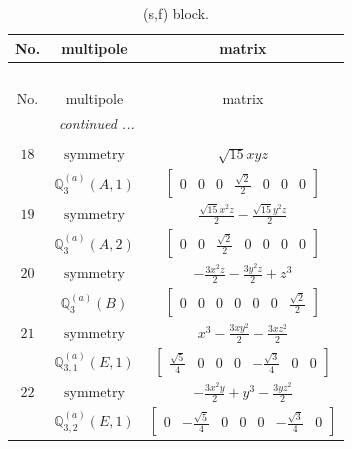 \documentclass[fleqn,8pt,landscape]{jsarticle}
\begin{document}
\begin{longtable}{ccc}
\caption{(s,f) block.}
 \\
 \hline \hline
No. & multipole & matrix \\ \hline \endfirsthead

\multicolumn{2}{l}{\tablename\ \thetable{}} \\
 \hline \hline
No. & multipole & matrix \\ \hline \endhead

 \hline \hline
\multicolumn{2}{r}{\footnotesize\it continued ...} \\ \endfoot

 \hline \hline
\multicolumn{2}{r}{} \\ \endlastfoot

$ 18 $ & $ \text{symmetry} $ & $ \sqrt{15} x y z $ \\
$  $ & $ \mathbb{Q}_{3}^{(a)}(A,1) $ & $ \begin{bmatrix} 0 & 0 & 0 & \frac{\sqrt{2}}{2} & 0 & 0 & 0 \end{bmatrix} $ \\ \hline
$ 19 $ & $ \text{symmetry} $ & $ \frac{\sqrt{15} x^{2} z}{2} - \frac{\sqrt{15} y^{2} z}{2} $ \\
$  $ & $ \mathbb{Q}_{3}^{(a)}(A,2) $ & $ \begin{bmatrix} 0 & 0 & \frac{\sqrt{2}}{2} & 0 & 0 & 0 & 0 \end{bmatrix} $ \\ \hline
$ 20 $ & $ \text{symmetry} $ & $ - \frac{3 x^{2} z}{2} - \frac{3 y^{2} z}{2} + z^{3} $ \\
$  $ & $ \mathbb{Q}_{3}^{(a)}(B) $ & $ \begin{bmatrix} 0 & 0 & 0 & 0 & 0 & 0 & \frac{\sqrt{2}}{2} \end{bmatrix} $ \\ \hline
$ 21 $ & $ \text{symmetry} $ & $ x^{3} - \frac{3 x y^{2}}{2} - \frac{3 x z^{2}}{2} $ \\
$  $ & $ \mathbb{Q}_{3,1}^{(a)}(E,1) $ & $ \begin{bmatrix} \frac{\sqrt{5}}{4} & 0 & 0 & 0 & - \frac{\sqrt{3}}{4} & 0 & 0 \end{bmatrix} $ \\ \hline
$ 22 $ & $ \text{symmetry} $ & $ - \frac{3 x^{2} y}{2} + y^{3} - \frac{3 y z^{2}}{2} $ \\
$  $ & $ \mathbb{Q}_{3,2}^{(a)}(E,1) $ & $ \begin{bmatrix} 0 & - \frac{\sqrt{5}}{4} & 0 & 0 & 0 & - \frac{\sqrt{3}}{4} & 0 \end{bmatrix} $ \\ \hline

\end{longtable}
\end{document}
